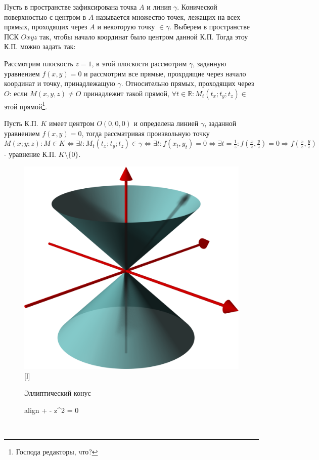 \documentclass[oneside]{book}
\newcommand{\boxedeq}[2]{\begin{empheq}[box={\fboxsep=6pt\fbox}]{align}\label{#1}#2\end{empheq}}
\begin{document}
\begin{itemize}
\begin{enumerate}
Пусть в пространстве зафиксирована точка $A$ и линия $\gamma$. Конической поверхностью с центром в $A$ называется множество точек, лежащих на всех прямых, проходящих
через $A$ и некоторую точку $\in \gamma$. Выберем в пространстве ПСК $Oxyz$  так, чтобы начало координат было центром данной К.П. Тогда этоу К.П. можно задать так:
\par Рассмотрим плоскость $z = 1$, в этой плоскости рассмотрим $\gamma$, заданную уравнением $f(x, y) = 0$ и рассмотрим все прямые, прохрдящие через начало
координат и точку, принадлежащую $\gamma$. Относительно прямых,  проходящих через $O$: если $M(x, y, z) \neq O$ принадлежит такой прямой, $\forall t \in \mathbb{R}: M_t(t_x; t_y; t_z) \in$ этой прямой\footnote{Господа редакторы, что?}.
\par Пусть К.П. $K$ имеет центром $O(0,0,0)$ и определена линией $\gamma$, заданной уравнением $f(x, y) = 0$, тогда рассматривая произвольную точку $M(x; y; z): M \in K \Leftrightarrow \exists t: M_t(t_x; t_y; t_z) \in \gamma \Leftrightarrow \exists t: f(x_t, y_t) = 0 \Leftrightarrow \exists t = \frac{1}{z}: f(\frac{x}{z}, \frac{y}{z}) = 0 \Rightarrow f(\frac{x}{z}, \frac{y}{z})$ - уравнение К.П. $K \setminus \{0\}$.    

\begin{figure}
        \centering
        \includegraphics[scale=0.05]{./pics/jiji.png}
[l]{Эллиптический конус \\ \boxedeq{eq:*}{ +  - z^2 = 0}}
\end{figure} \\


\end{enumerate}
\end{itemize}
\end{document}
